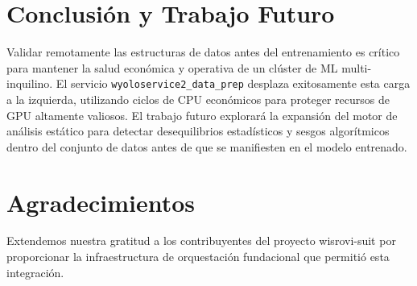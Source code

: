\documentclass[11pt,a4paper]{article}
\begin{document}
\section{Conclusión y Trabajo Futuro}
Validar remotamente las estructuras de datos antes del entrenamiento es crítico para mantener la salud económica y operativa de un clúster de ML multi-inquilino. El servicio \texttt{wyoloservice2\_data\_prep} desplaza exitosamente esta carga a la izquierda, utilizando ciclos de CPU económicos para proteger recursos de GPU altamente valiosos. El trabajo futuro explorará la expansión del motor de análisis estático para detectar desequilibrios estadísticos y sesgos algorítmicos dentro del conjunto de datos antes de que se manifiesten en el modelo entrenado.

\section{Agradecimientos}
Extendemos nuestra gratitud a los contribuyentes del proyecto wisrovi-suit por proporcionar la infraestructura de orquestación fundacional que permitió esta integración.



\end{document}
